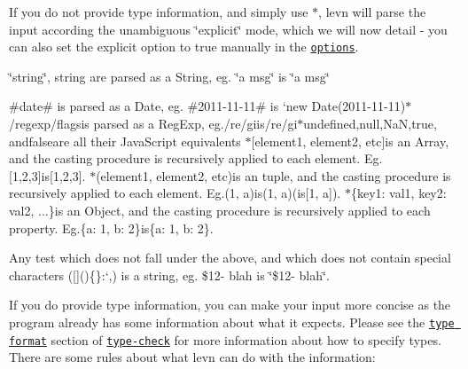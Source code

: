 If you do not provide type information, and simply use {\ttfamily $\ast$}, levn will parse the input according the unambiguous \char`\"{}explicit\char`\"{} mode, which we will now detail -\/ you can also set the {\ttfamily explicit} option to true manually in the \href{#options}{\tt options}.


\begin{DoxyItemize}
\item {\ttfamily \char`\"{}string\char`\"{}}, {\ttfamily \textquotesingle{}string\textquotesingle{}} are parsed as a String, eg. {\ttfamily \char`\"{}a msg\char`\"{}} is {\ttfamily \char`\"{}a msg\char`\"{}}
\item {\ttfamily \#date\#} is parsed as a Date, eg. {\ttfamily \#2011-\/11-\/11\#} is `new Date(\textquotesingle{}2011-\/11-\/11\textquotesingle{}){\ttfamily  $\ast$}/regexp/flags{\ttfamily is parsed as a Reg\+Exp, eg.}/re/gi{\ttfamily is}/re/gi{\ttfamily  $\ast$}undefined{\ttfamily ,}null{\ttfamily ,}Na\+N{\ttfamily ,}true{\ttfamily , and}false{\ttfamily are all their Java\+Script equivalents $\ast$}\mbox{[}element1, element2, etc\mbox{]}{\ttfamily is an Array, and the casting procedure is recursively applied to each element. Eg.}\mbox{[}1,2,3\mbox{]}{\ttfamily is}\mbox{[}1,2,3\mbox{]}{\ttfamily . $\ast$}(element1, element2, etc){\ttfamily is an tuple, and the casting procedure is recursively applied to each element. Eg.}(1, a){\ttfamily is}(1, a){\ttfamily (is}\mbox{[}1, \textquotesingle{}a\textquotesingle{}\mbox{]}{\ttfamily ). $\ast$}\{key1\+: val1, key2\+: val2, ...\}{\ttfamily is an Object, and the casting procedure is recursively applied to each property. Eg.}\{a\+: 1, b\+: 2\}{\ttfamily is}\{a\+: 1, b\+: 2\}{\ttfamily .}
\item {\ttfamily Any test which does not fall under the above, and which does not contain special characters (}\mbox{[}{\ttfamily \mbox{]}}({\ttfamily )}\{{\ttfamily \}}\+:`{\ttfamily ,}) is a string, eg. {\ttfamily \$12-\/ blah} is {\ttfamily \char`\"{}\$12-\/ blah\char`\"{}}.
\end{DoxyItemize}

If you do provide type information, you can make your input more concise as the program already has some information about what it expects. Please see the \href{https://github.com/gkz/type-check#type-format}{\tt type format} section of \href{https://github.com/gkz/type-check}{\tt type-\/check} for more information about how to specify types. There are some rules about what levn can do with the information\+:



